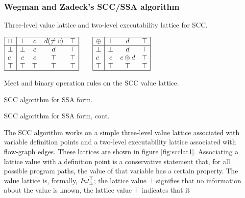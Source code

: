 \documentclass[12pt,titlepage,twoside]{article}
\newcommand*{\figscale}{1.0}
\newcommand{\meet}{\ensuremath{\sqcap}}
\begin{document}
\subsubsection{Wegman and Zadeck's SCC/SSA algorithm}
\begin{myfigure}
\centering\renewcommand*{\figscale}{0.5}
\caption[Value and executability lattices for SCC.]
{Three-level value lattice and two-level executability lattice for SCC.}
\label{fig:scclat1}
\end{myfigure}
\begin{mytable}\centering
$\begin{array}{|l|cccc|} \hline
\meet & \bot & c & d (\not= c) & \top \\ \hline
\bot  & \bot & c & d  & \top \\
c     &   c  & c &\top & \top \\
\top  & \top &\top&\top& \top \\ \hline
\end{array}%
\quad\quad%
\begin{array}{|l|ccc|}\hline
\oplus& \bot &   d  & \top \\ \hline
\bot  & \bot &   d  & \top \\
c     &   c  &c\oplus d& \top \\
\top  & \top & \top & \top \\ \hline
\end{array}$
\caption{Meet and binary operation rules on the SCC value lattice.}
\label{tab:sccmeet1}
\end{mytable}
\begin{myalgorithm}\small

\caption{SCC algorithm for SSA form.}\label{alg:scc}
\end{myalgorithm}
\begin{myalgorithm}\small

\caption{SCC algorithm for SSA form, cont.}\label{alg:scc2}
\end{myalgorithm}
The SCC algorithm works on a simple three-level value lattice
associated with variable definition points and a two-level
executability lattice associated with flow-graph edges.  These
lattices are shown in figure \vref{fig:scclat1}.  Associating a lattice
value with a definition point is a conservative statement that, for
all possible program paths, the value of that variable has a certain
property.  The value lattice is, formally, ${\mbox{\em Int}}_\bot^\top$;
the lattice value $\bot$ signifies that no information
about the value is known, the lattice value $\top$ indicates that it
\end{document}
